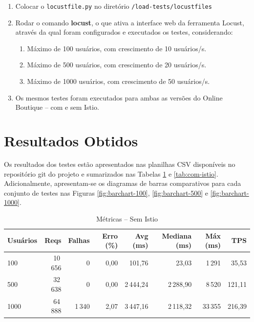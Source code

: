 \documentclass[12pt,a4paper]{report}
\begin{document}
\begin{enumerate}
  \item Colocar o \texttt{locustfile.py} no diretório \texttt{/load-tests/locustfiles}
  \item Rodar o comando \textbf{locust}, o que ativa a interface web da ferramenta Locust, através da qual foram configurados e executados os testes, considerando:
  \begin{enumerate}
      \item Máximo de 100 usuários, com crescimento de 10 usuários/s.
      \item Máximo de 500 usuários, com crescimento de 20 usuários/s.
      \item Máximo de 1000 usuários, com crescimento de 50 usuários/s.
  \end{enumerate}
  \item Os mesmos testes foram executados para ambas as versões do Online Boutique -- com e sem Istio.
\end{enumerate}



\section{Resultados Obtidos}
Os resultados dos testes estão apresentados nas planilhas CSV disponíveis no repositório git do projeto e sumarizados nas Tabelas \ref{tab:sem-istio} e \ref{tab:com-istio}. Adicionalmente, apresentam-se os diagramas de barras comparativos para cada conjunto de testes nas Figuras \ref{fig:barchart-100}, \ref{fig:barchart-500} e \ref{fig:barchart-1000}.

\begin{table}[H]
\centering
\caption{Métricas – Sem Istio}\label{tab:sem-istio}
\begin{tabular}{@{}lrrrrrrr@{}}
\toprule
Usuários & Reqs & Falhas & Erro (\%) & Avg (ms) & Mediana (ms) & Máx (ms) & TPS \\
\midrule
100  & 10\,656 & 0     & 0,00 & 101,76 & 23,03  & 1\,291  & 35,53  \\
500  & 32\,638 & 0     & 0,00 & 2\,444,24 & 2\,288,90 & 8\,520  & 121,11 \\
1000 & 64\,888 & 1\,340 & 2,07 & 3\,447,16 & 2\,118,32 & 33\,355 & 216,39 \\
\bottomrule
\end{tabular}
\end{table}
\end{document}
